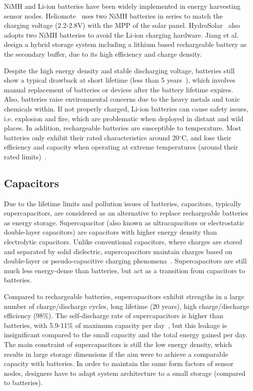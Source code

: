 NiMH and Li-ion batteries have been widely implemented in energy harvesting sensor nodes. Heliomote~\cite{raghunathan2005design} uses two NiMH batteries in series to match the charging voltage (2.2-2.8V) with the MPP of the solar panel. HydroSolar~\cite{taneja2008design} also adopts two NiMH batteries to avoid the Li-ion charging hardware. Jiang et al.~\cite{jiang2005perpetual} design a hybrid storage system including a lithium based rechargeable battery as the secondary buffer, due to its high efficiency and charge density.

Despite the high energy density and stable discharging voltage, batteries still show a typical drawback at short lifetime (less than 5 years~\cite{simjee2008efficient}), which involves manual replacement of batteries or devices after the battery lifetime expires. Also, batteries raise environmental concerns due to the heavy metals and toxic chemicals within. If not properly charged, Li-ion batteries can cause safety issues, i.e. explosion and fire, which are problematic when deployed in distant and wild places. In addition, rechargeable batteries are susceptible to temperature. Most batteries only exhibit their rated characteristics around 20$^\circ$C, and lose their efficiency and capacity when operating at extreme temperatures (around their rated limits)~\cite{prauzek2018energy}. 


\subsection{Capacitors}

Due to the lifetime limits and pollution issues of batteries, capacitors, typically supercapacitors, are considered as an alternative to replace rechargeable batteries as energy storage. Supercapacitor (also known as ultracapacitors or electrostatic double-layer capacitors) are capacitors with higher energy density than electrolytic capacitors. Unlike conventional capacitors, where charges are stored and separated by solid dielectric, supercapacitors maintain charges based on double-layer or pseudo-capacitive charging phenomena~\cite{bueno2019nanoscale}. Supercapacitors are still much less energy-dense than batteries, but act as a transition from capacitors to batteries. 

Compared to rechargeable batteries, supercapacitors exhibit strengths in a large number of charge/discharge cycles, long lifetime (20 years), high charge/discharge efficiency (98\%). The self-discharge rate of supercapacitors is higher than batteries, with 5.9-11\% of maximum capacity per day~\cite{libich2018supercapacitors, renner2009lifetime}, but this leakage is insignificant compared to the small capacity and the total energy gained per day. The main constraint of supercapacitors is still the low energy density, which results in large storage dimensions if the aim were to achieve a comparable capacity with batteries. In order to maintain the same form factors of sensor nodes, designers have to adapt system architecture to a small storage (compared to batteries).


